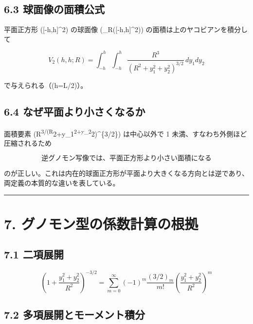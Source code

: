 \documentclass[
  12pt,
  a4paper,
]{article}
\begin{document}
\subsection{6.3
球面像の面積公式}\label{ux7403ux9762ux50cfux306eux9762ux7a4dux516cux5f0f}

平面正方形 ({[}-h,h{]}\^{}2) の球面像 (\Phi\_R({[}-h,h{]}\^{}2))
の面積は上のヤコビアンを積分して

\[
\boxed{
V_2(h,h;R) =
\int_{-h}^h \int_{-h}^h
\frac{R^3}{(R^2+y_1^2+y_2^2)^{3/2}}
\,dy_1dy_2
}
\]

で与えられる（(h=L/2)）。

\subsection{6.4
なぜ平面より小さくなるか}\label{ux306aux305cux5e73ux9762ux3088ux308aux5c0fux3055ux304fux306aux308bux304b}

面積要素
(R\textsuperscript{3/(R}2+y\_1\textsuperscript{2+y\_2}2)\^{}\{3/2\})
は中心以外で 1 未満、すなわち外側ほど圧縮されるため

\[
\boxed{
\text{逆グノモン写像では、平面正方形より小さい面積になる}
}
\]

のが正しい。これは内在的球面正方形が平面より大きくなる方向とは逆であり、両定義の本質的な違いを表している。

\begin{center}\rule{0.5\linewidth}{0.5pt}\end{center}

\section{7.
グノモン型の係数計算の根拠}\label{ux30b0ux30ceux30e2ux30f3ux578bux306eux4fc2ux6570ux8a08ux7b97ux306eux6839ux62e0}

\subsection{7.1 二項展開}\label{ux4e8cux9805ux5c55ux958b}

\[
\left(1+\frac{y_1^2+y_2^2}{R^2}\right)^{-3/2} =
\sum_{m=0}^\infty
(-1)^m \frac{(3/2)_m}{m!}
\left(\frac{y_1^2+y_2^2}{R^2}\right)^m
\]

\subsection{7.2
多項展開とモーメント積分}\label{ux591aux9805ux5c55ux958bux3068ux30e2ux30fcux30e1ux30f3ux30c8ux7a4dux5206}
\end{document}

